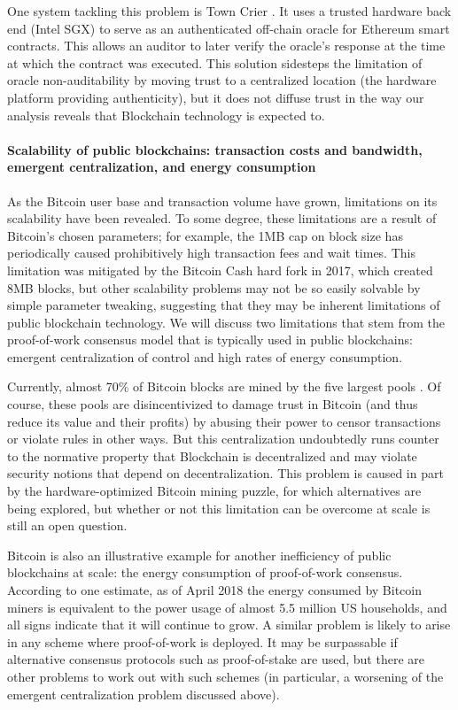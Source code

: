 One system tackling this problem is Town Crier \cite{Zhang16}. It uses a trusted hardware back end (Intel SGX) to serve as an authenticated off-chain oracle for Ethereum smart contracts. This allows an auditor to later verify the oracle's response at the time at which the contract was executed. This solution sidesteps the limitation of oracle non-auditability by moving trust to a centralized location (the hardware platform providing authenticity), but it does not diffuse trust in the way our analysis reveals that Blockchain technology is expected to.

\paragraph{Scalability of public blockchains: transaction costs and bandwidth, emergent centralization, and energy consumption}
As the Bitcoin user base and transaction volume have grown, limitations on its scalability have been revealed. To some degree, these limitations are a result of Bitcoin's chosen parameters; for example, the 1MB cap on block size has periodically caused prohibitively high transaction fees and wait times. This limitation was mitigated by the Bitcoin Cash hard fork in 2017, which created 8MB blocks, but other scalability problems may not be so easily solvable by simple parameter tweaking, suggesting that they may be inherent limitations of public blockchain technology. We will discuss two limitations that stem from the proof-of-work consensus model that is typically used in public blockchains: emergent centralization of control and high rates of energy consumption.

Currently, almost 70\% of Bitcoin blocks are mined by the five largest pools \cite{BlockchainInfoPools}. Of course, these pools are disincentivized to damage trust in Bitcoin (and thus reduce its value and their profits) by abusing their power to censor transactions or violate rules in other ways. But this centralization undoubtedly runs counter to the normative property that Blockchain is decentralized and may violate security notions that depend on decentralization. This problem is caused in part by the hardware-optimized Bitcoin mining puzzle, for which alternatives are being explored, but whether or not this limitation can be overcome at scale is still an open question.

Bitcoin is also an illustrative example for another inefficiency of public blockchains at scale: the energy consumption of proof-of-work consensus. According to one estimate\cite{Digiconomist}, as of April 2018 the energy consumed by Bitcoin miners is equivalent to the power usage of almost 5.5 million US households, and all signs indicate that it will continue to grow. A similar problem is likely to arise in any scheme where proof-of-work is deployed. It may be surpassable if alternative consensus protocols such as proof-of-stake are used, but there are other problems to work out with such schemes (in particular, a worsening of the emergent centralization problem discussed above). 

